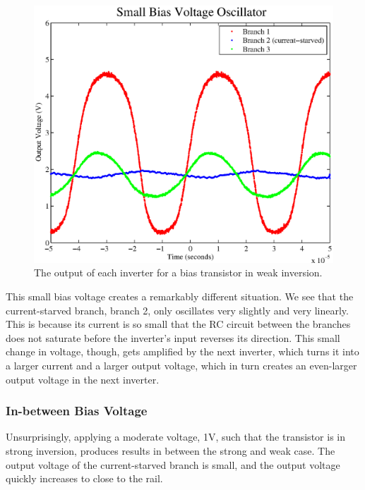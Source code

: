 \documentclass{article}
\begin{document}
\begin{figure}[H]
\centering
\includegraphics[scale=.6]{small_bias.eps}
\caption{The output of each inverter for a bias transistor in weak inversion.}
\label{smallBias}
\end{figure}

This small bias voltage creates a remarkably different situation.  We see that the current-starved branch, branch 2, only oscillates very slightly and very linearly.  This is because its current is so small that the RC circuit between the branches does not saturate before the inverter's input reverses its direction.  This small change in voltage, though, gets amplified by the next inverter, which turns it into a larger current and a larger output voltage, which in turn creates an even-larger output voltage in the next inverter.

\subsubsection*{In-between Bias Voltage}

Unsurprisingly, applying a moderate voltage, 1V, such that the transistor is in strong inversion, produces results in between the strong and weak case.  The output voltage of the current-starved branch is small, and the output voltage quickly increases to close to the rail.
\end{document}
